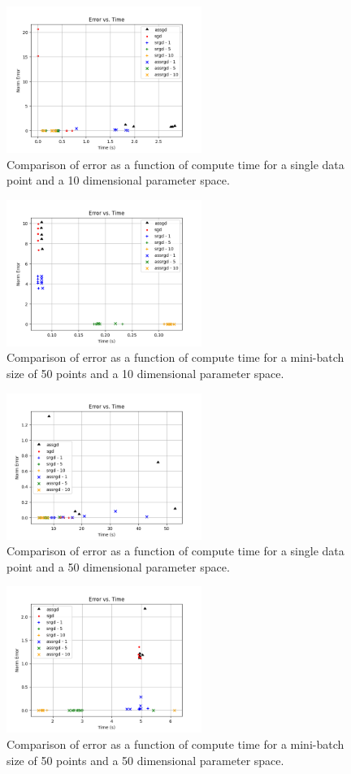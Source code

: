 \documentclass[conference,compsoc]{IEEEtran}
\begin{document}
\begin{figure}[!t]
    \centering
    \includegraphics[width=2.5in]{dim-10-batch-1}
    \caption{Comparison of error as a function of compute time for a single
    data point and a 10 dimensional parameter space.}
    \label{fig:dim10}
\end{figure}
\begin{figure}[!t]
    \centering
    \includegraphics[width=2.5in]{dim-10-batch-50}
    \caption{Comparison of error as a function of compute time for a mini-batch
    size of 50 points and a 10 dimensional parameter space.}
    \label{fig:dim10}
\end{figure}
\begin{figure}[!t]
    \centering
    \includegraphics[width=2.5in]{dim-50-batch-1}
    \caption{Comparison of error as a function of compute time for a single data
    point and a 50 dimensional parameter space.}
    \label{fig:dim10}
\end{figure}
\begin{figure}[!t]
    \centering
    \includegraphics[width=2.5in]{dim-50-batch-50}
    \caption{Comparison of error as a function of compute time for a mini-batch
        size of 50 points and a 50 dimensional parameter space.}
    \label{fig:dim50}
\end{figure}
\end{document}

